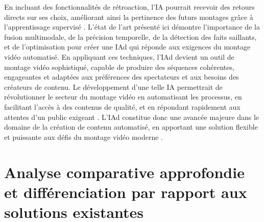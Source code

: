 \documentclass[livre]{udes-genie-these}
\begin{document}
En incluant des fonctionnalités de rétroaction, l'IA pourrait recevoir des retours directs sur ses choix, améliorant ainsi la pertinence des futurs montages grâce à l'apprentissage supervisé \cite{anonymous2023_videollama}\cite{zhang2020_temporal}.
L'état de l'art présenté ici démontre l'importance de la fusion multimodale, de la précision temporelle, de la détection des faits saillants, et de l'optimisation pour créer une IAd qui réponde aux exigences du montage vidéo automatisé. En appliquant ces techniques, l'IAd devient un outil de montage vidéo sophistiqué, capable de produire des séquences cohérentes, engageantes et adaptées aux préférences des spectateurs et aux besoins des créateurs de contenu.
Le développement d'une telle IA permettrait de révolutionner le secteur du montage vidéo en automatisant les processus, en facilitant l'accès à des contenus de qualité, et en répondant rapidement aux attentes d'un public exigeant \cite{zhou2024}\cite{zhang2023}\cite{tang2023}\cite{gygli2015_submodular}. L'IAd constitue donc une avancée majeure dans le domaine de la création de contenu automatisé, en apportant une solution flexible et puissante aux défis du montage vidéo moderne \cite{zhang2016_lstm}\cite{wang2024_lave}.


\section{Analyse comparative approfondie et différenciation par rapport aux solutions existantes}
\end{document}
